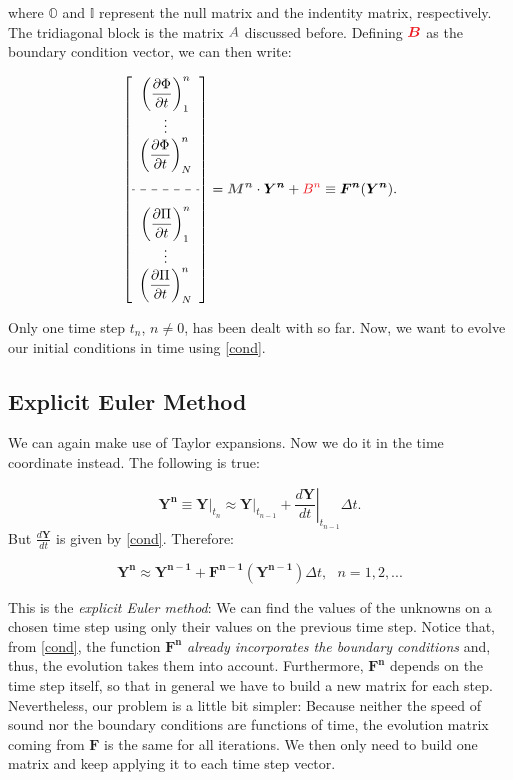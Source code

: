 \documentclass{article}
\begin{document}
where $\mathbb{O}$ and $\mathbb{I}$ represent the null matrix and the indentity matrix, respectively. The tridiagonal block is the matrix $\textcolor{grayII}{A}$ discussed before. Defining $\textcolor{Red}{\bm{B}}$ as the boundary condition vector, we can then write:

\begin{equation}\label{cond}
\left[\begin{array}{c}
\displaystyle\left(\frac{\partial \Phi}{\partial t}\right)^n_1\\
\vdots\\
\displaystyle\left(\frac{\partial \Phi}{\partial t}\right)^n_N\\
\text{ }\\
\hdashline\\
\displaystyle\left(\frac{\partial \Pi}{\partial t}\right)^n_1\\
\vdots\\
\displaystyle\left(\frac{\partial \Pi}{\partial t}\right)^n_N
\end{array}\right]=\textcolor{grayII}{\bm{M^n}}\cdot \bm{Y^n}+\textcolor{Red}{B^n}\equiv \bm{F^n}(\bm{Y^n}).
\end{equation}

Only one time step $t_n$, $n\neq0$, has been dealt with so far. Now, we want to evolve our initial conditions in time using \eqref{cond}.

\subsection{Explicit Euler Method}

We can again make use of Taylor expansions. Now we do it in the time coordinate instead. The following is true:

\begin{equation}\label{ttaylor}
\bm{Y^{n}}\equiv\left.\bm{Y}\right|_{t_n}\approx\left.\bm{Y}\right|_{t_{n-1}}+\left.\frac{d \bm{Y}}{d t}\right|_{t_{n-1}}\Delta t.
\end{equation}
But $\displaystyle\frac{d \bm{Y}}{d t}$ is given by \eqref{cond}. Therefore:

\begin{equation}\label{eeuler}
\boxed{\bm{Y^{n}}\approx\bm{Y^{n-1}}+\bm{F^{n-1}}(\bm{Y^{n-1}})\Delta t, \text{ }n=1,2,...}
\end{equation}

This is the \textit{explicit Euler method}: We can find the values of the unknowns on a chosen time step using only their values on the previous time step. Notice that, from \eqref{cond}, the function $\bm{F^n}$ \textit{already incorporates the boundary conditions} and, thus, the evolution takes them into account. Furthermore, $\bm{F^n}$ depends on the time step itself, so that in general we have to build a new matrix for each step. Nevertheless, our problem is a little bit simpler: Because neither the speed of sound nor the boundary conditions are functions of time, the evolution matrix coming from $\bm{F}$ is the same for all iterations. We then only need to build one matrix and keep applying it to each time step vector. 
\end{document}
